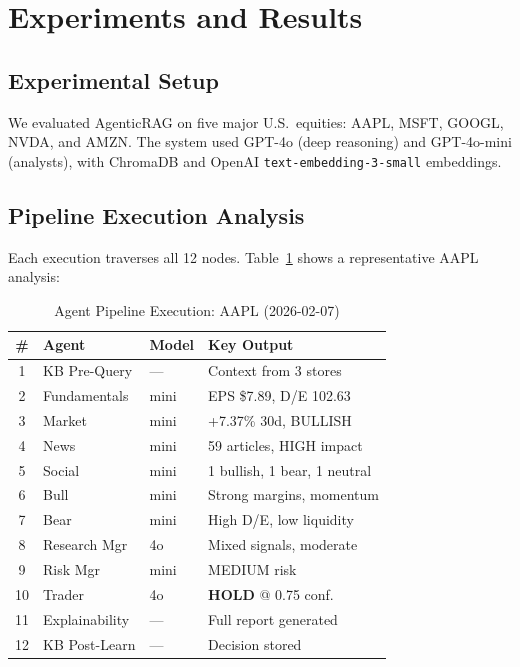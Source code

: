 \documentclass[conference]{IEEEtran}
\begin{document}
\section{Experiments and Results}

\subsection{Experimental Setup}

We evaluated AgenticRAG on five major U.S.\ equities: AAPL, MSFT, GOOGL, NVDA, and AMZN. The system used GPT-4o (deep reasoning) and GPT-4o-mini (analysts), with ChromaDB and OpenAI \texttt{text-embedding-3-small} embeddings.

\subsection{Pipeline Execution Analysis}

Each execution traverses all 12 nodes. Table~\ref{tab:pipeline} shows a representative AAPL analysis:

\begin{table}[htbp]
\caption{Agent Pipeline Execution: AAPL (2026-02-07)}
\label{tab:pipeline}
\centering
\footnotesize
\begin{tabular}{@{}clll@{}}
\toprule
\textbf{\#} & \textbf{Agent} & \textbf{Model} & \textbf{Key Output} \\
\midrule
1 & KB Pre-Query & --- & Context from 3 stores \\
2 & Fundamentals & mini & EPS \$7.89, D/E 102.63 \\
3 & Market & mini & +7.37\% 30d, BULLISH \\
4 & News & mini & 59 articles, HIGH impact \\
5 & Social & mini & 1 bullish, 1 bear, 1 neutral \\
6 & Bull & mini & Strong margins, momentum \\
7 & Bear & mini & High D/E, low liquidity \\
8 & Research Mgr & 4o & Mixed signals, moderate \\
9 & Risk Mgr & mini & MEDIUM risk \\
10 & Trader & 4o & \textbf{HOLD} @ 0.75 conf. \\
11 & Explainability & --- & Full report generated \\
12 & KB Post-Learn & --- & Decision stored \\
\bottomrule
\end{tabular}
\end{table}
\end{document}
